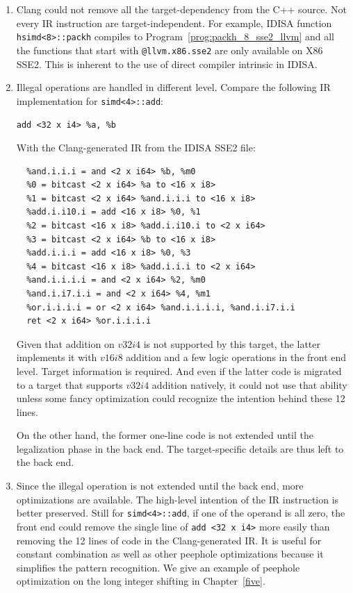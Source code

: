 \begin{enumerate}
    \item Clang could not remove all the target-dependency from the C++ source. Not every IR instruction are target-independent. For example, IDISA function {\tt hsimd<8>::packh} compiles to Program~\ref{prog:packh_8_sse2_llvm} and all the functions that start with {\tt @llvm.x86.sse2} are only available on X86 SSE2. This is inherent to the use of direct compiler intrinsic in IDISA.
    \newpage

    \item Illegal operations are handled in different level. Compare the following IR implementation for {\tt simd<4>::add}:
      \begin{center}
        \verb|add <32 x i4> %a, %b|
      \end{center}
    With the Clang-generated IR from the IDISA SSE2 file:
      \begin{center}
        \begin{verbatim}
  %and.i.i.i = and <2 x i64> %b, %m0
  %0 = bitcast <2 x i64> %a to <16 x i8>
  %1 = bitcast <2 x i64> %and.i.i.i to <16 x i8>
  %add.i.i10.i = add <16 x i8> %0, %1
  %2 = bitcast <16 x i8> %add.i.i10.i to <2 x i64>
  %3 = bitcast <2 x i64> %b to <16 x i8>
  %add.i.i.i = add <16 x i8> %0, %3
  %4 = bitcast <16 x i8> %add.i.i.i to <2 x i64>
  %and.i.i.i.i = and <2 x i64> %2, %m0
  %and.i.i7.i.i = and <2 x i64> %4, %m1
  %or.i.i.i.i = or <2 x i64> %and.i.i.i.i, %and.i.i7.i.i
  ret <2 x i64> %or.i.i.i.i
        \end{verbatim}
      \end{center}

    Given that addition on $v32i4$ is not supported by this target, the latter implements it with $v16i8$ addition and a few logic operations in the front end level. Target information is required. And even if the latter code is migrated to a target that supports $v32i4$ addition natively, it could not use that ability unless some fancy optimization could recognize the intention behind these 12 lines.

    On the other hand, the former one-line code is not extended until the legalization phase in the back end. The target-specific details are thus left to the back end.

    \item Since the illegal operation is not extended until the back end, more optimizations are available. The high-level intention of the IR instruction is better preserved. Still for {\tt simd<4>::add}, if one of the operand is all zero, the front end could remove the single line of \verb|add <32 x i4>| more easily than removing the 12 lines of code in the Clang-generated IR\@. It is useful for constant combination as well as other peephole optimizations because it simplifies the pattern recognition. We give an example of peephole optimization on the long integer shifting in Chapter~\ref{five}.
\end{enumerate}

